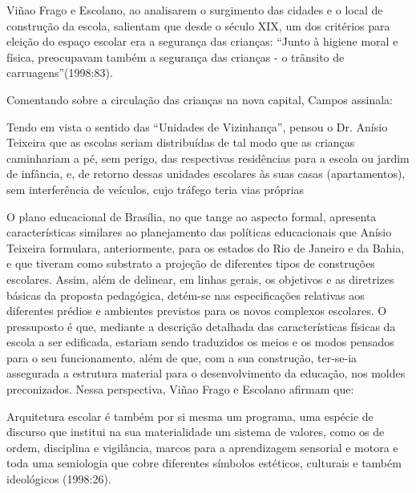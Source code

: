 Viñao Frago e Escolano, ao analisarem o surgimento das cidades e o local de
construção da escola, salientam que desde o século XIX, um dos critérios para eleição
do espaço escolar era a segurança das crianças: “Junto à higiene moral e física,
preocupavam também a segurança das crianças - o trânsito de carruagens”(1998:83).

Comentando sobre a circulação das crianças na nova capital, Campos assinala:
\begin{citacao}
    Tendo em vista o sentido das “Unidades de Vizinhança”, pensou o Dr.
    Anísio Teixeira que as escolas seriam distribuídas de tal modo que as
    crianças caminhariam a pé, sem perigo, das respectivas residências para a
    escola ou jardim de infância, e, de retorno dessas unidades escolares às suas
    casas (apartamentos), sem interferência de veículos, cujo tráfego teria vias
    próprias
\end{citacao}

O plano educacional de Brasília, no que tange ao aspecto formal, apresenta
características similares ao planejamento das políticas educacionais que Anísio Teixeira
formulara, anteriormente, para os estados do Rio de Janeiro e da Bahia, e que tiveram
como substrato a projeção de diferentes tipos de construções escolares. Assim, além de
delinear, em linhas gerais, os objetivos e as diretrizes básicas da proposta pedagógica,
detém-se nas especificações relativas aos diferentes prédios e ambientes previstos para
os novos complexos escolares. O pressuposto é que, mediante a descrição detalhada das
características físicas da escola a ser edificada, estariam sendo traduzidos os meios e os
modos pensados para o seu funcionamento, além de que, com a sua construção, ter-se-ia
assegurada a estrutura material para o desenvolvimento da educação, nos moldes
preconizados. Nessa perspectiva, Viñao Frago e Escolano afirmam que:

\begin{citacao}
    Arquitetura escolar é também por si mesma um programa, uma espécie de
    discurso que institui na sua materialidade um sistema de valores, como os de
    ordem, disciplina e vigilância, marcos para a aprendizagem sensorial e
    motora e toda uma semiologia que cobre diferentes símbolos estéticos,
    culturais e também ideológicos (1998:26).
\end{citacao}

